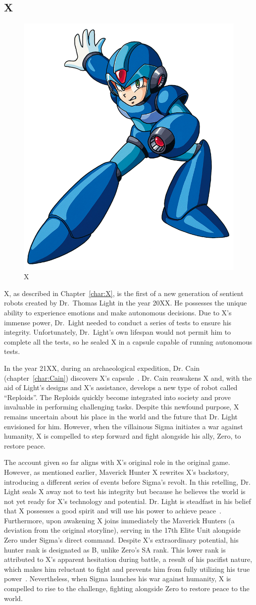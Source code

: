 \subsection{X}
\begin{figure}[htp]
	\centering
	\includegraphics[width=0.3\linewidth]{figures/X1/X_X1.png}
	\caption{X}
\end{figure}

X, as described in Chapter~\ref{char:X}, is the first of a new generation of sentient robots created by Dr.~Thomas Light in the year 20XX. He possesses the unique ability to experience emotions and make autonomous decisions. Due to X's immense power, Dr.~Light needed to conduct a series of tests to ensure his integrity. Unfortunately, Dr.~Light's own lifespan would not permit him to complete all the tests, so he sealed X in a capsule capable of running autonomous tests.

In the year 21XX, during an archaeological expedition, Dr. Cain (chapter~\ref{char:Cain}) discovers X's capsule~\cite{X:Manual,wiki:Cain_journal}. Dr. Cain reawakens X and, with the aid of Light's designs and X's assistance, develops a new type of robot called ``Reploids''. The Reploids quickly become integrated into society and prove invaluable in performing challenging tasks. Despite this newfound purpose, X remains uncertain about his place in the world and the future that Dr. Light envisioned for him. However, when the villainous Sigma initiates a war against humanity, X is compelled to step forward and fight alongside his ally, Zero, to restore peace.

The account given so far aligns with X's original role in the original game. However, as mentioned earlier, Maverick Hunter X rewrites X's backstory, introducing a different series of events before Sigma's revolt. In this retelling, Dr. Light seals X away not to test his integrity but because he believes the world is not yet ready for X's technology and potential. Dr. Light is steadfast in his belief that X possesses a good spirit and will use his power to achieve peace~\cite{wiki:MM_MHX_X}. Furthermore, upon awakening X joins immediately the Maverick Hunters (a deviation from the original storyline), serving in the 17th Elite Unit alongside Zero under Sigma's direct command. Despite X's extraordinary potential, his hunter rank is designated as B, unlike Zero's SA rank. This lower rank is attributed to X's apparent hesitation during battle, a result of his pacifist nature, which makes him reluctant to fight and prevents him from fully utilizing his true power~\cite{Xcoll1:Manual_X1}. Nevertheless, when Sigma launches his war against humanity, X is compelled to rise to the challenge, fighting alongside Zero to restore peace to the world.

